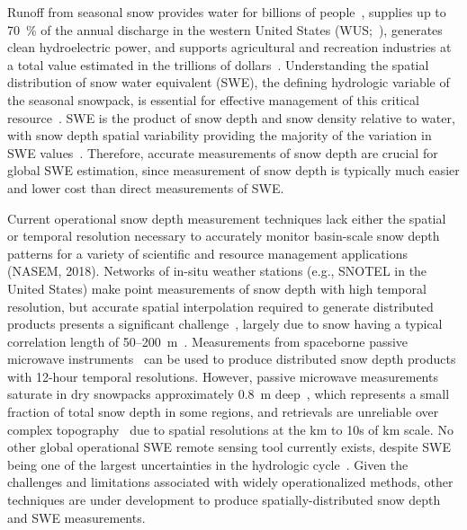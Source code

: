 \documentclass[journal abbreviation, manuscript]{copernicus}
\begin{document}


\introduction  %

Runoff from seasonal snow provides water for billions of people~\citep{Barnett.2005, Mankin.2015}, supplies up to 70~\% of the annual discharge in the western United States (WUS;~\citet{Li.201743j}), generates clean hydroelectric power, and supports agricultural and recreation industries at a total value estimated in the trillions of dollars~\citep{Sturm.2017}. Understanding the spatial distribution of snow water equivalent (SWE), the defining hydrologic variable of the seasonal snowpack, is essential for effective management of this critical resource~\citep{Bales.2006}. SWE is the product of snow depth and snow density relative to water, with snow depth spatial variability providing the majority of the variation in SWE values~\citep{Sturm.20109ji}. Therefore, accurate measurements of snow depth are crucial for global SWE estimation, since measurement of snow depth is typically much easier and lower cost than direct measurements of SWE.

Current operational snow depth measurement techniques lack either the spatial or temporal resolution necessary to accurately monitor basin-scale snow depth patterns for a variety of scientific and resource management applications (NASEM, 2018)\nocite{Sciences.2018}. Networks of in-situ weather stations (e.g., SNOTEL in the United States) make point measurements of snow depth with high temporal resolution, but accurate spatial interpolation required to generate distributed products presents a significant challenge~\citep{Dressler.2006, Bales.2006, Schneider.2016}, largely due to snow having a typical correlation length of 50--200~m~\citep{Trujillo.2009}.  Measurements from spaceborne passive microwave instruments~\citep{Kelly.2003, Takala.2011} can be used to produce distributed snow depth products with 12-hour temporal resolutions. However, passive microwave measurements saturate in dry snowpacks approximately 0.8~m deep~\citep{Tedesco.2010, Smith.2018}, which represents a small fraction of total snow depth in some regions, and retrievals are unreliable over complex topography~\citep{Tong.2010} due to spatial resolutions at the km to 10s of km scale. No other global operational SWE remote sensing tool currently exists, despite SWE being one of the largest uncertainties in the hydrologic cycle~\citep{Sciences.2018}. Given the challenges and limitations associated with widely operationalized methods, other techniques are under development to produce spatially-distributed snow depth and SWE measurements.
\end{document}
